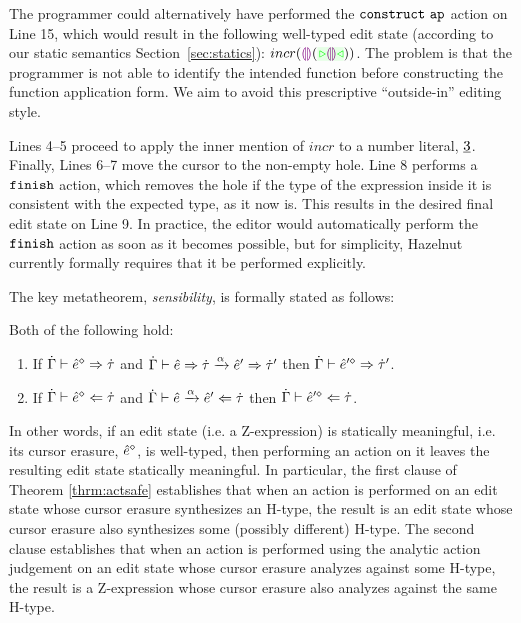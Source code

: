 The programmer could alternatively have performed the $\mathtt{construct}~\mathtt{ap}$
action on Line 15, which would result in the following well-typed edit state (according to our static semantics Section~\ref{sec:statics}):
$incr(\hhole{}(\zwsel{\hhole{}}))$. 
The problem is that the programmer is not able to identify the intended
function before constructing the function application form. We aim to avoid this prescriptive ``outside-in'' editing style.

Lines 4--5 proceed to apply the inner
mention of $incr$ to a number literal, $\underline{3}$. Finally, Lines
6--7 move the cursor to the non-empty hole. Line 8 performs a $\mathtt{finish}$
action, which removes the hole if the type of the
expression inside it is consistent with the expected type, as it now
is. This results in the desired final edit state on Line 9. In
practice, the editor would automatically perform the $\mathtt{finish}$ action as
soon as it becomes possible, but for simplicity, Hazelnut currently formally requires
that it be performed explicitly.

The key 
metatheorem, \emph{sensibility}, is formally stated as follows:%
\begin{theorem}
  \label{thrm:actsafe} Both of the following hold:
  \begin{enumerate}%
  \item If $\dot{\Gamma} \vdash \hat{e}^{\diamond} \Rightarrow \dot{\tau}$ and
    $\dot{\Gamma} \vdash \hat{e} \Rightarrow \dot{\tau} \xrightarrow{\alpha} \hat{e}' \Rightarrow \dot{\tau}'$ then
    $\dot{\Gamma} \vdash \hat{e}'^{\diamond} \Rightarrow \dot{\tau}'$.
  \item If $\dot{\Gamma} \vdash \hat{e}^{\diamond} \Leftarrow \dot{\tau}$ and
    $\dot{\Gamma} \vdash \hat{e} \xrightarrow{\alpha} \hat{e}' \Leftarrow \dot{\tau}$ then
    $\dot{\Gamma} \vdash \hat{e}'^{\diamond} \Leftarrow \dot{\tau}$.
  \end{enumerate}
\end{theorem}
\noindent In other words, if an edit state (i.e. a Z-expression) is
statically meaningful, i.e. its cursor erasure, $\hat{e}^{\diamond}$, is well-typed, then
performing an action on it leaves the resulting edit state statically
meaningful. In particular, the first clause of Theorem \ref{thrm:actsafe}
establishes that when an action is performed on an edit state whose cursor
erasure synthesizes an H-type, the result is an edit state whose cursor
erasure also synthesizes some (possibly different) H-type. The second
clause establishes that when an action is performed using the analytic
action judgement on an edit state whose cursor erasure analyzes against
some H-type, the result is a Z-expression whose cursor erasure also
analyzes against the same H-type.

